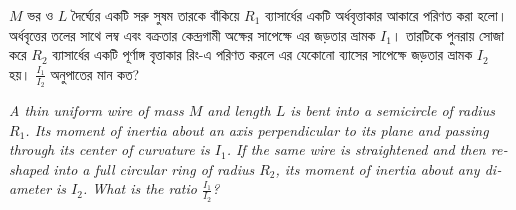 \documentclass[12pt, a4paper]{article}
\begin{document}
\begin{tcolorbox}[questionbox={প্রশ্ন (Question) 1}]
    \noindent
    $M$ ভর ও $L$ দৈর্ঘ্যের একটি সরু সুষম তারকে বাঁকিয়ে $R_1$ ব্যাসার্ধের একটি অর্ধবৃত্তাকার আকারে পরিণত করা হলো। অর্ধবৃত্তের তলের সাথে লম্ব এবং বক্রতার কেন্দ্রগামী অক্ষের সাপেক্ষে এর জড়তার ভ্রামক $I_1$। তারটিকে পুনরায় সোজা করে $R_2$ ব্যাসার্ধের একটি পূর্ণাঙ্গ বৃত্তাকার রিং-এ পরিণত করলে এর যেকোনো ব্যাসের সাপেক্ষে জড়তার ভ্রামক $I_2$ হয়। $\frac{I_1}{I_2}$ অনুপাতের মান কত?
    
    \vspace{0.8em}
    \begin{english}
    \noindent\textit{\color{darkgray}
    A thin uniform wire of mass $M$ and length $L$ is bent into a semicircle of radius $R_1$. Its moment of inertia about an axis perpendicular to its plane and passing through its center of curvature is $I_1$. If the same wire is straightened and then reshaped into a full circular ring of radius $R_2$, its moment of inertia about any diameter is $I_2$. What is the ratio $\frac{I_1}{I_2}$?
    }
    \end{english}
\end{tcolorbox}

\vspace{1em}
\begin{center}
\end{center}
\vspace{1em}
\end{document}
